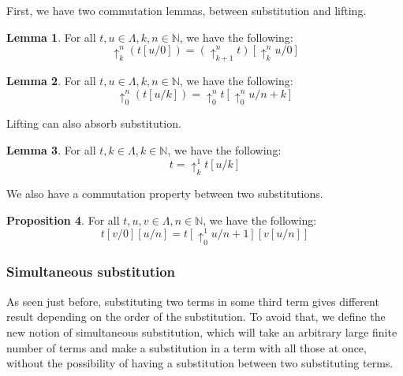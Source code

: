 \documentclass{article}
\newcommand{\bN}[0]{\mathbb N}
\newcommand{\lift}[2]{\uparrow_{#1}^{#2}}
\theoremstyle{definition}
\newtheorem{prop}{Proposition}[subsection]
\newtheorem{lem}[prop]{Lemma}
\begin{document}
First, we have two commutation lemmas, between substitution and lifting.

\begin{lem}
    For all $t,u\in\Lambda, k,n\in \bN$, we have the following:
    $$\lift k n (t[u/0]) = (\lift {k + 1} n t)[\lift k n u/0]$$
\end{lem}

\begin{lem}
    For all $t,u\in\Lambda, k,n\in\bN$, we have the following:
    $$\lift 0 n (t[u/k]) = \lift 0 n t[\lift 0 n u/n+k]$$
\end{lem}

Lifting can also absorb substitution.

\begin{lem}
    For all $t,k\in\Lambda,k\in\bN$, we have the following:
    $$t = \lift k 1 t[u/k]$$
\end{lem}

We also have a commutation property between two substitutions.

\begin{prop}
    For all $t,u,v\in\Lambda,n\in\bN$, we have the following:
    $$t[v/0][u/n] = t[\lift 0 1 u / n + 1][v[u/n]]$$
\end{prop}

\subsubsection{Simultaneous substitution}

As seen just before, substituting two terms in some third term gives different result depending on the order
of the substitution. To avoid that, we define the new notion of simultaneous substitution, which will take
an arbitrary large finite number of terms and make a substitution in a term with all those at once, without
the possibility of having a substitution between two substituting terms.
\end{document}
